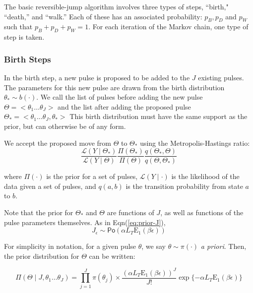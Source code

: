 \documentclass[iop,onecolumn]{emulateapj}
\newcommand{\Eqn}[1]{Eqn\thinspace(\ref{#1})}
\newcommand{\Po}{\mathsf{Po}}\newcommand{\Un}{\mathsf{Un}}
\newcommand{\Eone}{{\ensuremath{\mathrm{E}_1}}}
\begin{document}
    The basic reversible-jump algorithm involves three types of steps, ``birth," ``death,'' and ``walk.'' Each of these has an associated probability: $p_B, p_D$ and $p_W$ such that $p_B + p_D + p_W = 1$.  For each iteration of the Markov chain, one type of step is taken. 

    \subsubsection{Birth Steps}

    In the birth step, a new pulse is proposed to be added to the $J$ existing pulses. The parameters for this new pulse are drawn from the birth distribution $ \theta_* \sim b(\cdot)$.  We call the list of pulses before adding the new pulse $\Theta = <\theta_1 \dots \theta_J>$  and the list after adding the proposed pulse $\Theta_* =   <\theta_1 \dots \theta_J, \theta_*>$  This birth distribution must have the same support as the prior, but can otherwise be of any form. 

    We accept the proposed move from $\Theta$ to $\Theta_*$ using the Metropolis-Hastings ratio:
    \begin{equation}
 \frac{\mathcal{L}(Y \mid \Theta_* )}{\mathcal{L}(Y \mid \Theta )} \frac{\Pi(\Theta_*)}{\Pi(\Theta)} 
       \frac{q(\Theta_*, \Theta)}{q(\Theta, \Theta_*)}     
    \end{equation}

     where $\Pi(\cdot)$ is the prior for a set of pulses, $\mathcal{L}(Y \mid \cdot)$ is the likelihood of the data given a set of pulses, and $q(a,b)$ is the transition probability from state $a$ to $b$. 

    Note that the prior for $\Theta_*$ and $\Theta$ are functions of $J$, as well as functions of the pulse parameters themselves. As in \Eqn{eq:prior-J}, 
     \begin{equation}
J_\epsilon \sim \Po(\alpha L_T  \Eone(\beta \epsilon) )      
     \end{equation}

    For simplicity in notation, for a given pulse $\theta$, we say $\theta \sim \pi(\cdot)$ \emph{a priori}. 
    Then, the prior distribution for $\Theta$ can be written:
    
    \begin{equation}
  \Pi(\Theta \mid J, \theta_1 \dots \theta_J) = \prod_{j = 1}^J \pi(\theta_j) \times \frac{(\alpha L_T  \Eone(\beta \epsilon) )^J}{J!} \exp\{-\alpha L_T  \Eone(\beta \epsilon)\}    
    \end{equation}
\end{document}
